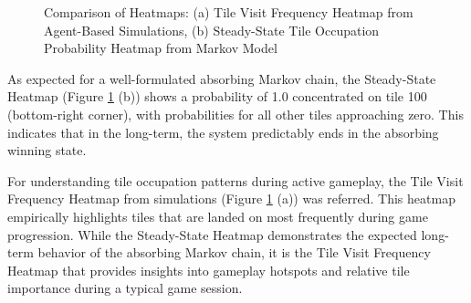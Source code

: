\begin{figure}[ht]
	\centering
	\caption{Comparison of Heatmaps: (a) Tile Visit Frequency Heatmap from Agent-Based Simulations, (b) Steady-State Tile Occupation Probability Heatmap from Markov Model}
	\label{fig:steady_state_heatmap_chapter3}
\end{figure}

As expected for a well-formulated absorbing Markov chain, the Steady-State Heatmap (Figure \ref{fig:steady_state_heatmap_chapter3} (b)) shows a probability of 1.0 concentrated on tile 100 (bottom-right corner), with probabilities for all other tiles approaching zero. This indicates that in the long-term, the system predictably ends in the absorbing winning state.

For understanding tile occupation patterns during active gameplay, the Tile Visit Frequency Heatmap from simulations (Figure \ref{fig:steady_state_heatmap_chapter3} (a)) was referred. This heatmap empirically highlights tiles that are landed on most frequently during game progression.  While the Steady-State Heatmap demonstrates the expected long-term behavior of the absorbing Markov chain, it is the Tile Visit Frequency Heatmap that provides insights into gameplay hotspots and relative tile importance during a typical game session.


